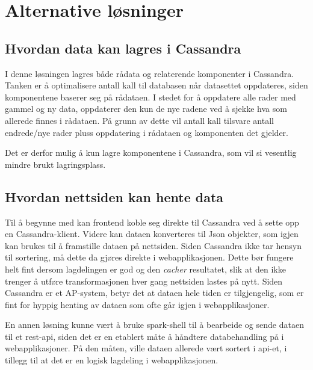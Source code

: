\section{Alternative løsninger}

\subsection{Hvordan data kan lagres i Cassandra}
I denne løsningen lagres både rådata og relaterende komponenter i Cassandra. Tanken er å optimalisere antall kall til databasen når datasettet oppdateres, siden komponentene baserer seg på rådataen. I stedet for å oppdatere alle rader med gammel og ny data, oppdaterer den kun de nye radene ved å sjekke hva som allerede finnes i rådataen. På grunn av dette vil antall kall tilsvare antall endrede/nye rader pluss oppdatering i rådataen og komponenten det gjelder.

Det er derfor mulig å kun lagre komponentene i Cassandra, som vil si vesentlig mindre brukt lagringsplass. 

\subsection{Hvordan nettsiden kan hente data}
Til å begynne med kan frontend koble seg direkte til Cassandra ved å sette opp en Cassandra-klient. Videre kan dataen konverteres til Json objekter, som igjen kan brukes til å framstille dataen på nettsiden. Siden Cassandra ikke tar hensyn til sortering, må dette da gjøres direkte i webapplikasjonen. Dette bør fungere helt fint dersom lagdelingen er god og den \textit{cacher} resultatet, slik at den ikke trenger å utføre transformasjonen hver gang nettsiden lastes på nytt. Siden Cassandra er et AP-system, betyr det at dataen hele tiden er tilgjengelig, som er fint for hyppig henting av dataen som ofte går igjen i webapplikasjoner.

En annen løsning kunne vært å bruke spark-shell til å bearbeide og sende dataen til et rest-api, siden det er en etablert måte å håndtere databehandling på i webapplikasjoner. På den måten, ville dataen allerede vært sortert i api-et, i tillegg til at det er en logisk lagdeling i webapplikasjonen.
